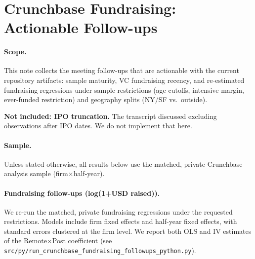 \documentclass{article}
\newcommand{\cleanedresultsdir}{../results/cleaned/tex}
\begin{document}
\thispagestyle{empty}

\section*{Crunchbase Fundraising: Actionable Follow-ups}

\paragraph{Scope.}
This note collects the meeting follow-ups that are actionable with the current repository artifacts:
sample maturity, VC fundraising recency, and re-estimated fundraising regressions under sample restrictions
(age cutoffs, intensive margin, ever-funded restriction) and geography splits (NY/SF vs.\ outside).
\par
\textbf{Not included: IPO truncation.} The transcript discussed excluding observations after IPO dates. We do not implement that here.

\paragraph{Sample.}
Unless stated otherwise, all results below use the matched, private Crunchbase analysis sample (firm$\times$half-year).

\begin{table}[H]
\caption{\textbf{Sample maturity: firm age cutoffs}}

\end{table}

\begin{table}[H]
\caption{\textbf{VC fundraising recency bins (as-of 2020-01-01)}}

\end{table}

\paragraph{Fundraising follow-ups (log(1+USD raised)).}
We re-run the matched, private fundraising regressions under the requested restrictions. Models include firm fixed effects
and half-year fixed effects, with standard errors clustered at the firm level. We report both OLS and IV estimates of the
Remote$\times$Post coefficient (see \texttt{src/py/run\_crunchbase\_fundraising\_followups\_python.py}).

\begin{table}[H]
\caption{\textbf{Fundraising follow-ups: sample restrictions}}

\end{table}

\begin{table}[H]
\caption{\textbf{Fundraising follow-ups: geography splits and interaction}}

\end{table}
\end{document}

